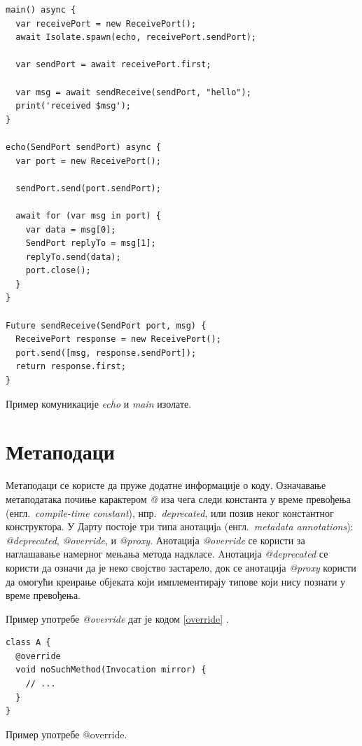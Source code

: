 \documentclass[12pt,oneside]{memoir}
\begin{document}
\begin{listing}
\begin{verbatim}
main() async {
  var receivePort = new ReceivePort();
  await Isolate.spawn(echo, receivePort.sendPort);

  var sendPort = await receivePort.first;

  var msg = await sendReceive(sendPort, "hello");
  print('received $msg');
}

echo(SendPort sendPort) async {
  var port = new ReceivePort();

  sendPort.send(port.sendPort);

  await for (var msg in port) {
    var data = msg[0];
    SendPort replyTo = msg[1];
    replyTo.send(data);
    port.close();
  }
}

Future sendReceive(SendPort port, msg) {
  ReceivePort response = new ReceivePort();
  port.send([msg, response.sendPort]);
  return response.first;
}
\end{verbatim}
\caption{Пример комуникације \textit{echo} и \textit{main} изолате.}
\label{izolate_primer}
\end{listing}

\section{Метаподаци}
\label{metapodaci}
Метаподаци се користе да пруже додатне информације о коду. Означавање метаподатака почиње карактером \textit{@} иза чега следи константа у време превођења (енгл.~\textit{compile-time constant}), нпр.~\textit{deprecated}, или позив неког константног конструктора. 
У Дарту постоје три типа анотацијa (енгл.~\textit{metadata annotations}): \textit{@deprecated}, \textit{@override}, и \textit{@proxy}.
Анотација \textit{@override} се користи за наглашавање намерног мењања метода надкласе. Aнотација \textit{@deprecated} се користи да означи да је неко својство застарело, док се анотација \textit{@proxy} користи да омогући креирање објеката који имплементирају типове који нису познати у време превођења.

Пример употребе \textit{@override} дат је кодом \ref{override} \cite{dart, dart1}. 

\begin{listing}
\begin{verbatim}
class A {
  @override
  void noSuchMethod(Invocation mirror) {
    // ...
  }
}
\end{verbatim}
\caption{Пример употребе @override.}
\label{override}
\end{listing}
\end{document}
